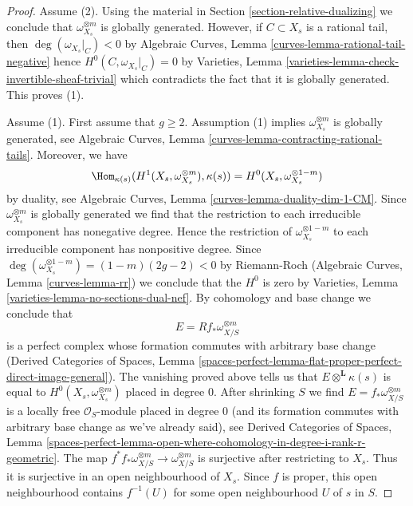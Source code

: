 \begin{proof}
Assume (2). Using the material in Section \ref{section-relative-dualizing}
we conclude that $\omega_{X_s}^{\otimes m}$ is
globally generated. However, if $C \subset X_s$
is a rational tail, then $\deg(\omega_{X_s}|_C) < 0$ by
Algebraic Curves, Lemma \ref{curves-lemma-rational-tail-negative}
hence $H^0(C, \omega_{X_s}|_C) = 0$ by
Varieties, Lemma \ref{varieties-lemma-check-invertible-sheaf-trivial}
which contradicts the fact that it is globally generated.
This proves (1).

\medskip\noindent
Assume (1). First assume that $g \geq 2$. Assumption (1) 
implies $\omega_{X_s}^{\otimes m}$ is globally generated,
see Algebraic Curves, Lemma \ref{curves-lemma-contracting-rational-tails}.
Moreover, we have
$$
\Hom_{\kappa(s)}(H^1(X_s, \omega_{X_s}^{\otimes m}), \kappa(s)) =
H^0(X_s, \omega_{X_s}^{\otimes 1 - m})
$$
by duality, see Algebraic Curves, Lemma \ref{curves-lemma-duality-dim-1-CM}.
Since $\omega_{X_s}^{\otimes m}$ is globally generated we find
that the restriction to each irreducible component has nonegative degree.
Hence the restriction of $\omega_{X_s}^{\otimes 1 - m}$ to each
irreducible component has nonpositive degree. Since
$\deg(\omega_{X_s}^{\otimes 1 - m}) = (1 - m)(2g - 2) < 0$ by Riemann-Roch
(Algebraic Curves, Lemma \ref{curves-lemma-rr}) we conclude that the $H^0$
is zero by Varieties, Lemma \ref{varieties-lemma-no-sections-dual-nef}.
By cohomology and base change we conclude that
$$
E = Rf_*\omega_{X/S}^{\otimes m}
$$
is a perfect complex whose formation commutes with arbitrary base change
(Derived Categories of Spaces, Lemma
\ref{spaces-perfect-lemma-flat-proper-perfect-direct-image-general}).
The vanishing proved above tells us that $E \otimes^\mathbf{L} \kappa(s)$
is equal to $H^0(X_s, \omega_{X_s}^{\otimes m})$ placed in degree $0$.
After shrinking $S$ we find $E = f_*\omega_{X/S}^{\otimes m}$
is a locally free $\mathcal{O}_S$-module placed in degree $0$
(and its formation commutes with arbitrary base change as
we've already said), see Derived Categories of Spaces, Lemma
\ref{spaces-perfect-lemma-open-where-cohomology-in-degree-i-rank-r-geometric}.
The map $f^*f_*\omega_{X/S}^{\otimes m} \to \omega_{X/S}^{\otimes m}$
is surjective after restricting to $X_s$. Thus it is surjective in
an open neighbourhood of $X_s$. Since $f$ is proper, this open
neighbourhood contains $f^{-1}(U)$ for some open neighbourhood
$U$ of $s$ in $S$.


\end{proof}
